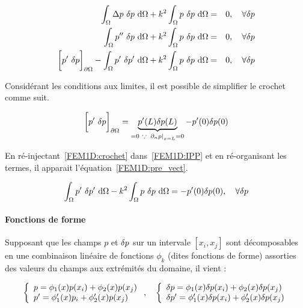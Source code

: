 \begin{eqnarray}
	\int_\Omega \Delta p~\delta p~\mathrm{d}\Omega + k^2 \int_\Omega p~\delta p~\mathrm{d}\Omega & =  & 0,\quad \forall\delta p\notag\\
	\int_\Omega p''~\delta p~\mathrm{d}\Omega + k^2 \int_\Omega p~\delta p~\mathrm{d}\Omega & =  & 0,\quad \forall\delta p\notag\\
	\bigg[p'~\delta p\bigg]_{\partial\Omega} - \int_\Omega p'~\delta p' ~\mathrm{d}\Omega + k^2\int_\Omega p~\delta p~\mathrm{d}\Omega & = & 0, \quad \forall\delta p \label{FEM1D:IPP}
\end{eqnarray}

Considérant les conditions aux limites, il est possible de simplifier le crochet comme suit.

\begin{equation}
	\bigg[p'~\delta p\bigg]_{\partial\Omega} = \underbrace{p'(L)\delta p(L)}_{=0~\because~\left.\partial_np\right|_{x=L}= 0} - p'(0)\delta p(0) \label{FEM1D:crochet}\\
\end{equation}

En ré-injectant~\eqref{FEM1D:crochet} dans~\eqref{FEM1D:IPP} et en ré-organisant les termes, il apparait l'équation~\ref{FEM1D:pre_vect}.

\begin{equation}
	\int_\Omega p'~\delta p'~\mathrm{d}\Omega - k^2\int_\Omega p~\delta p~\mathrm{d}\Omega = -p'(0)\delta p(0), \quad \forall\delta p \label{FEM1D:IPP}
\end{equation}

\paragraph{Fonctions de forme}

Supposant que les champs $p$ et $\delta p$ sur un intervale $[x_i, x_j]$ sont décomposables en une combinaison linéaire de
fonctions $\phi_k$ (dites fonctions de forme) assorties des valeurs du champs aux extrémités du domaine, il vient :

\begin{equation}
	\left\{\begin{array}{l}
		p = \phi_1(x)p(x_i) + \phi_2(x)p(x_j)\\
		p' = \phi_1'(x)p_i + \phi_2'(x)p(x_j)\\
	\end{array}\right., \quad
	\left\{\begin{array}{l}
		\delta p = \phi_1(x)\delta p(x_i) + \phi_2(x)\delta p(x_j)\\
		\delta p' = \phi_1'(x)\delta p(x_i) + \phi_2'(x)\delta p(x_j)\\
	\end{array}\right.\label{FEM1D:shapefun}
\end{equation}

